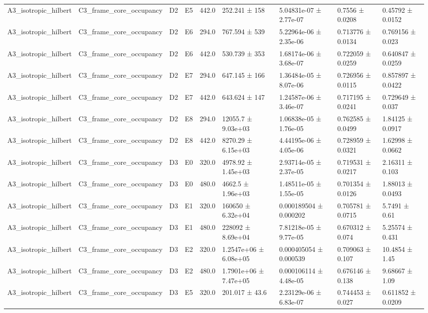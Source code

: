 \begin{table}
\begin{tabular}{lllllllll}
A3\_isotropic\_hilbert & C3\_frame\_core\_occupancy & D2 & E5 & 442.0 & 252.241 ± 158 & 5.04831e-07 ± 2.77e-07 & 0.7556 ± 0.0208 & 0.45792 ± 0.0152 \\
A3\_isotropic\_hilbert & C3\_frame\_core\_occupancy & D2 & E6 & 294.0 & 767.594 ± 539 & 5.22964e-06 ± 2.35e-06 & 0.713776 ± 0.0134 & 0.769156 ± 0.023 \\
A3\_isotropic\_hilbert & C3\_frame\_core\_occupancy & D2 & E6 & 442.0 & 530.739 ± 353 & 1.68174e-06 ± 3.68e-07 & 0.722059 ± 0.0259 & 0.640847 ± 0.0259 \\
A3\_isotropic\_hilbert & C3\_frame\_core\_occupancy & D2 & E7 & 294.0 & 647.145 ± 166 & 1.36484e-05 ± 8.07e-06 & 0.726956 ± 0.0115 & 0.857897 ± 0.0422 \\
A3\_isotropic\_hilbert & C3\_frame\_core\_occupancy & D2 & E7 & 442.0 & 643.624 ± 147 & 1.24587e-06 ± 3.46e-07 & 0.717195 ± 0.0241 & 0.729649 ± 0.037 \\
A3\_isotropic\_hilbert & C3\_frame\_core\_occupancy & D2 & E8 & 294.0 & 12055.7 ± 9.03e+03 & 1.06838e-05 ± 1.76e-05 & 0.762585 ± 0.0499 & 1.84125 ± 0.0917 \\
A3\_isotropic\_hilbert & C3\_frame\_core\_occupancy & D2 & E8 & 442.0 & 8270.29 ± 6.15e+03 & 4.44195e-06 ± 4.05e-06 & 0.728959 ± 0.0321 & 1.62998 ± 0.0662 \\
A3\_isotropic\_hilbert & C3\_frame\_core\_occupancy & D3 & E0 & 320.0 & 4978.92 ± 1.45e+03 & 2.93714e-05 ± 2.37e-05 & 0.719531 ± 0.0217 & 2.16311 ± 0.103 \\
A3\_isotropic\_hilbert & C3\_frame\_core\_occupancy & D3 & E0 & 480.0 & 4662.5 ± 1.96e+03 & 1.48511e-05 ± 1.55e-05 & 0.701354 ± 0.0126 & 1.88013 ± 0.0493 \\
A3\_isotropic\_hilbert & C3\_frame\_core\_occupancy & D3 & E1 & 320.0 & 160650 ± 6.32e+04 & 0.000189504 ± 0.000202 & 0.705781 ± 0.0715 & 5.7491 ± 0.61 \\
A3\_isotropic\_hilbert & C3\_frame\_core\_occupancy & D3 & E1 & 480.0 & 228092 ± 8.69e+04 & 7.81218e-05 ± 9.77e-05 & 0.670312 ± 0.074 & 5.25574 ± 0.431 \\
A3\_isotropic\_hilbert & C3\_frame\_core\_occupancy & D3 & E2 & 320.0 & 1.2547e+06 ± 6.08e+05 & 0.000405054 ± 0.000539 & 0.709063 ± 0.107 & 10.4854 ± 1.45 \\
A3\_isotropic\_hilbert & C3\_frame\_core\_occupancy & D3 & E2 & 480.0 & 1.7901e+06 ± 7.47e+05 & 0.000106114 ± 4.48e-05 & 0.676146 ± 0.138 & 9.68667 ± 1.09 \\
A3\_isotropic\_hilbert & C3\_frame\_core\_occupancy & D3 & E5 & 320.0 & 201.017 ± 43.6 & 2.23129e-06 ± 6.83e-07 & 0.744453 ± 0.027 & 0.611852 ± 0.0209 \\

\end{tabular}
\end{table}
